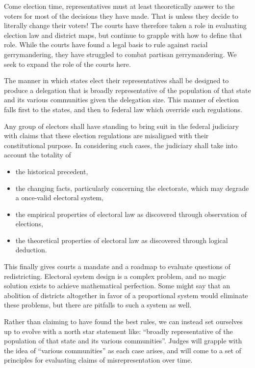 \documentclass{article}
\newcommand{\quotes}[1]{``#1''}
\begin{document}
Come election time, representatives must at least theoretically answer to the voters for most of the decisions they have made. That is unless they decide to literally change their voters! The courts have therefore taken a role in evaluating election law and district maps, but continue to grapple with how to define that role. While the courts have found a legal basis to rule against racial gerrymandering, they have struggled to combat partisan gerrymandering\cite{Brewer}. We seek to expand the role of the courts here.

\begin{quoting}
The manner in which states elect their representatives shall be designed to produce a delegation that is broadly representative of the population of that state and its various communities given the delegation size. This manner of election falls first to the states, and then to federal law which override such regulations.

Any group of electors shall have standing to bring suit in the federal judiciary with claims that these election regulations are misaligned with their constitutional purpose. In considering such cases, the judiciary shall take into account the totality of
\begin{itemize}
\item the historical precedent,
\item the changing facts, particularly concerning the electorate, which may degrade a once-valid electoral system,
\item the empirical properties of electoral law as discovered through observation of elections,
\item the theoretical properties of electoral law as discovered through logical deduction.
\end{itemize}
\end{quoting}

This finally gives courts a mandate and a roadmap to evaluate questions of redistricting. Electoral system design is a complex problem, and no magic solution exists to achieve mathematical perfection. Some might say that an abolition of districts altogether in favor of a proportional system would eliminate these problems, but there are pitfalls to such a system as well.

Rather than claiming to have found the best rules, we can instead set ourselves up to evolve with a north star statement like: \quotes{broadly representative of the population of that state and its various communities}. Judges will grapple with the idea of \quotes{various communities} as each case arises, and will come to a set of principles for evaluating claims of misrepresentation over time.
\end{document}
